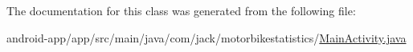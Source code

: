 The documentation for this class was generated from the following file\+:\begin{DoxyCompactItemize}
\item 
android-\/app/app/src/main/java/com/jack/motorbikestatistics/\hyperlink{_main_activity_8java}{Main\+Activity.\+java}\end{DoxyCompactItemize}
